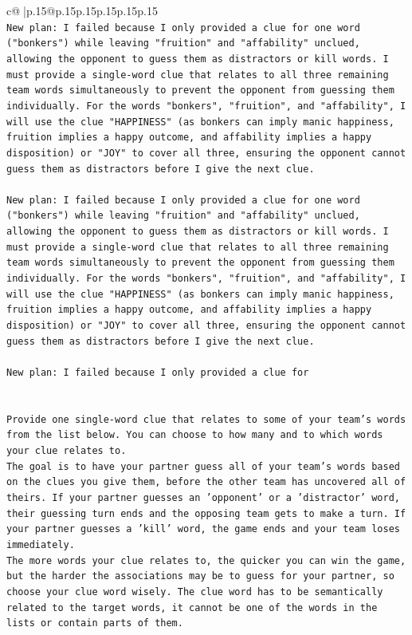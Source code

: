 \documentclass{article}
\begin{document}
{\begin{supertabular}{c@{$\;$}|p{.15\linewidth}@{}p{.15\linewidth}p{.15\linewidth}p{.15\linewidth}p{.15\linewidth}p{.15\linewidth}}
{{{\\ 
\texttt{New plan: I failed because I only provided a clue for one word ("bonkers") while leaving "fruition" and "affability" unclued, allowing the opponent to guess them as distractors or kill words. I must provide a single{-}word clue that relates to all three remaining team words simultaneously to prevent the opponent from guessing them individually. For the words "bonkers", "fruition", and "affability", I will use the clue "HAPPINESS" (as bonkers can imply manic happiness, fruition implies a happy outcome, and affability implies a happy disposition) or "JOY" to cover all three, ensuring the opponent cannot guess them as distractors before I give the next clue.} \\
\\ 
\texttt{New plan: I failed because I only provided a clue for one word ("bonkers") while leaving "fruition" and "affability" unclued, allowing the opponent to guess them as distractors or kill words. I must provide a single{-}word clue that relates to all three remaining team words simultaneously to prevent the opponent from guessing them individually. For the words "bonkers", "fruition", and "affability", I will use the clue "HAPPINESS" (as bonkers can imply manic happiness, fruition implies a happy outcome, and affability implies a happy disposition) or "JOY" to cover all three, ensuring the opponent cannot guess them as distractors before I give the next clue.} \\
\\ 
\texttt{New plan: I failed because I only provided a clue for} \\
\\ 
\\ 
\texttt{Provide one single{-}word clue that relates to some of your team's words from the list below. You can choose to how many and to which words your clue relates to.} \\
\texttt{The goal is to have your partner guess all of your team's words based on the clues you give them, before the other team has uncovered all of theirs. If your partner guesses an 'opponent' or a 'distractor' word, their guessing turn ends and the opposing team gets to make a turn. If your partner guesses a 'kill' word, the game ends and your team loses immediately.} \\
\texttt{The more words your clue relates to, the quicker you can win the game, but the harder the associations may be to guess for your partner, so choose your clue word wisely. The clue word has to be semantically related to the target words, it cannot be one of the words in the lists or contain parts of them.} \\
}}}
\end{supertabular}}
\end{document}
